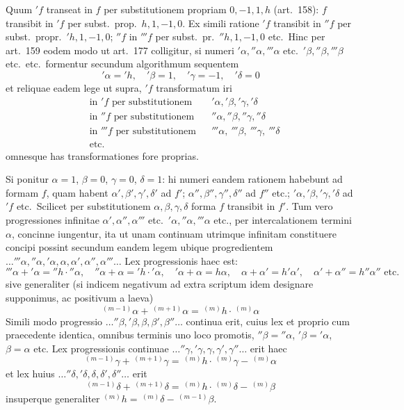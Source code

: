 \documentclass[12pt,a4paper]{article}
\theoremstyle{plain}
\theoremstyle{definition}
\theoremstyle{remark}
\begin{document}
Quum $'f$ transeat in $f$ per substitutionem propriam $0,-1,1,h$ (art.\ 158): $f$ transibit in $'f$ per subst.\ prop.\ $h,1,-1,0$. Ex simili ratione $'f$ transibit in $''f$ per subst.\ propr.\ $'h,1,-1,0$; $''f$ in $'''f$ per subst.\ pr.\ $''h,1,-1,0$ etc.\ Hinc per art.\ 159 eodem modo ut art.\ 177 colligitur, si numeri $'\alpha,''\alpha,'''\alpha$ etc.\ $'\beta,''\beta,'''\beta$ etc.\ etc.\ formentur secundum algorithmum sequentem
\['\alpha='h,\quad '\beta=1,\quad '\gamma=-1,\quad '\delta=0\]
et reliquae eadem lege ut supra,
$'f$ transformatum iri
\begin{align*}
&\text{in }'f\text{ per substitutionem}&&'\alpha,'\beta,'\gamma,'\delta\\
&\text{in }''f\text{ per substitutionem}&&''\alpha,''\beta,''\gamma,''\delta\\
&\text{in }'''f\text{ per substitutionem}&&'''\alpha,\ '''\beta,\ '''\gamma,\ '''\delta\\
&\text{etc.}\end{align*}
omnesque has transformationes fore proprias.

Si ponitur $\alpha=1$, $\beta=0$, $\gamma=0$, $\delta=1$: hi numeri eandem rationem habebunt ad formam $f$, quam habent $\alpha',\beta',\gamma',\delta'$ ad $f'$; $\alpha'',\beta'',\gamma'',\delta''$ ad $f''$ etc.; $'\alpha,'\beta,'\gamma,'\delta$ ad $'f$ etc.\ Scilicet per substitutionem $\alpha,\beta,\gamma,\delta$ forma $f$ transibit in $f'$. Tum vero progressiones infinitae $\alpha',\alpha'',\alpha'''$ etc.\ $'\alpha,''\alpha,'''\alpha$ etc., per intercalationem termini $\alpha$, concinne iungentur, ita ut unam continuam utrimque infinitam constituere concipi possint secundum eandem legem ubique progredientem $\ldots'''\alpha,''\alpha,'\alpha,\alpha,\alpha',\alpha'',\alpha'''\ldots$ Lex progressionis haec est:
\['''\alpha+'\alpha=''h\cdot''\alpha,\quad ''\alpha+\alpha='h\cdot'\alpha,\quad '\alpha+\alpha=h\alpha,\quad \alpha+\alpha'=h'\alpha',\quad \alpha'+\alpha''=h''\alpha''\text{ etc.}\]
sive generaliter (si indicem negativum ad extra scriptum idem designare supponimus, ac positivum a laeva)
\[^{(m-1)}\alpha+\,^{(m+1)}\alpha=\,^{(m)}h\cdot\,^{(m)}\alpha\]
Simili modo progressio $\ldots''\beta,'\beta,\beta,\beta',\beta''\ldots$ continua erit, cuius lex et proprio cum praecedente identica, omnibus terminis uno loco promotis, $''\beta=''\alpha$, $'\beta='\alpha$, $\beta=\alpha$ etc. Lex progressionis continuae $\ldots''\gamma,'\gamma,\gamma,\gamma',\gamma''\ldots$ erit haec
\[^{(m-1)}\gamma+\,^{(m+1)}\gamma=\,^{(m)}h\cdot\,^{(m)}\gamma-\,^{(m)}\alpha\]
et lex huius $\ldots''\delta,'\delta,\delta,\delta',\delta''\ldots$ erit
\[^{(m-1)}\delta+\,^{(m+1)}\delta=\,^{(m)}h\cdot\,^{(m)}\delta-\,^{(m)}\beta\]
insuperque generaliter $^{(m)}h=\,^{(m)}\delta-\,^{(m-1)}\beta$.
\end{document}
